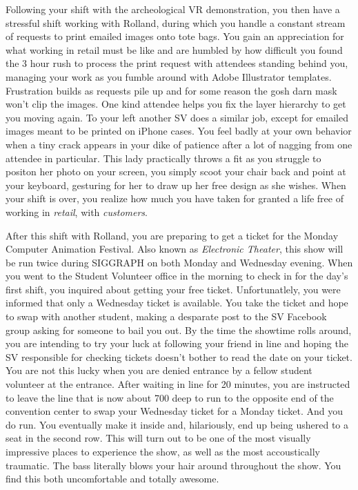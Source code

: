 \documentclass[../main.tex]{subfiles}
\begin{document}
Following your shift with the archeological VR demonstration, you then have a stressful shift working with Rolland, during which you handle a constant stream of requests to print emailed images onto tote bags. You gain an appreciation for what working in retail must be like and are humbled by how difficult you found the 3 hour rush to process the print request with attendees standing behind you, managing your work as you fumble around with Adobe Illustrator templates. Frustration builds as requests pile up and for some reason the gosh darn mask won't clip the images. One kind attendee helps you fix the layer hierarchy to get you moving again. To your left another SV does a similar job, except for emailed images meant to be printed on iPhone cases. You feel badly at your own behavior when a tiny crack appears in your dike of patience after a lot of nagging from one attendee in particular. This lady practically throws a fit as you struggle to positon her photo on your screen, you simply scoot your chair back and point at your keyboard, gesturing for her to draw up her free design as she wishes. When your shift is over, you realize how much you have taken for granted a life free of working in \textit{retail}, with \textit{customers}.

After this shift with Rolland, you are preparing to get a ticket for the Monday Computer Animation Festival. Also known as \textit{Electronic Theater}, this show will be run twice during SIGGRAPH on both Monday and Wednesday evening. When you went to the Student Volunteer office in the morning to check in for the day's first shift, you inquired about getting your free ticket. Unfortunatlely, you were informed that only a Wednesday ticket is available. You take the ticket and hope to swap with another student, making a desparate post to the SV Facebook group asking for someone to bail you out. By the time the showtime rolls around, you are intending to try your luck at following your friend in line and hoping the SV responsible for checking tickets doesn't bother to read the date on your ticket. You are not this lucky when you are denied entrance by a fellow student volunteer at the entrance. After waiting in line for 20 minutes, you are instructed to leave the line that is now about 700 deep to run to the opposite end of the convention center to swap your Wednesday ticket for a Monday ticket. And you do run. You eventually make it inside and, hilariously, end up being ushered to a seat in the second row. This will turn out to be one of the most visually impressive places to experience the show, as well as the most accoustically traumatic. The bass literally blows your hair around throughout the show. You find this both uncomfortable and totally awesome.
\end{document}
